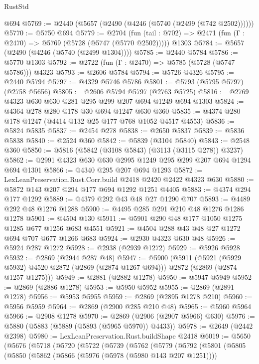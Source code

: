 \begin{lexlean}{RustStd}
\begin{coremodule}
{\begin{coremodule}
{{{{{{{{{{{{    @694
@5769 := @2440 (@5657 (@2490 (@4246 (@5740 (@2499 (@742 @2502))))))
@5770 := @5750 @694
@5779 := @2704
    (fun (tail : @702) => @2471 (fun (Γ : @2470) => @5769 (@5728 (@5747 (@5770 @2502)))))
    @1303
@5784 := @5657 (@2490 (@4246 (@5740 (@2499 @1304))))
@5785 := @2440 @5784
@5786 := @5770 @1303
@5792 := @2722 (fun (Γ : @2470) => @5785 (@5728 (@5747 @5786))) @4323
@5793 := @2606 @5784
@5794 := @5726 @4326
@5795 := @2440 @5794
@5797 := @4329 @5746 @5786
@5801 := @5793 (@5795 @5797) (@2758 @5656)
@5805 := @2606 @5794 @5797 (@2763 @5725)
@5816 := @2769 @4323 @630 @630 @281 @295 @299 @207 @694 @1249 @694 @1303
@5824 := @4364 @278 @280 @178 @30 @694 @1247 @630 @360
@5835 := @4374 @280 @178 @1247 (@4414 @132 @25 @177 @768 @1052 @4517 @4553)
@5836 := @5824 @5835
@5837 := @2454 @278
@5838 := @2650 @5837
@5839 := @5836 @5838
@5840 := @2524 @360
@5842 := @5839 (@3104 @5840)
@5843 := @2548 @360
@5850 := @5816 (@5842 (@3108 @5843) (@3113 (@3115 @278)) @3237)
@5862 := @2991 @4323 @630 @630 @2995 @1249 @295 @299 @207 @694 @1294 @694 @1301
@5866 := @4340 @295 @207 @694 @1293
@5872 := LexLeanPreservation.Rust.Corr.build @2418 @2420 @2422 @4323 @630
@5880 := @5872 @143 @207 @294 @177 @694 @1292 @1251 @4405
@5883 := @4374 @294 @177 @1292
@5889 := @4379 @292 @43 @48 @27 @1290 @707
@5893 := @4489 @292 @48 @1276 @1288
@5900 := @4495 @285 @291 @210 @48 @1276 @1286 @1278
@5901 := @4504 @130
@5911 := @5901 @290 @48 @177 @1050 @1275 @1285 @677 @1256 @683 @4551
@5921 := @4504 @288 @43 @48 @27 @1272 @694 @707 @677 @1266 @683
@5924 := @2930 @4323 @630 @48
@5926 := @5924 @287 @1272
@5928 := @2938 (@2939 @1272)
@5929 := @5926 @5928
@5932 := @2869 (@2944 @287 @48)
@5947 := @5900
    (@5911
      (@5921 (@5929 @5932) @4520 @2872 (@2869 (@2874 @1267 @694)))
      @2872
      (@2869 (@2874 @1257 @1275)))
@5949 := @2881 (@2882 @1278)
@5950 := @5947 @5949
@5952 := @2869 (@2886 @1278)
@5953 := @5950 @5952
@5955 := @2869 (@2891 @1278)
@5956 := @5953 @5955
@5959 := @2869 (@2895 @1278 @210)
@5960 := @5956 @5959
@5964 := @2869 (@2900 @285 @210 @48)
@5965 := @5960 @5964
@5966 := @2908 @1278
@5970 := @2869 (@2906 (@2907 @5966) @630)
@5976 := @5880 (@5883 (@5889 (@5893 (@5965 @5970)) @4433))
@5978 := @2649 (@2442 @2398)
@5980 := LexLeanPreservation.Rust.buildShape @2418
@6019 := @5650
    (@5676
      (@5718
        (@5720
          (@5722
            (@5739
              (@5762
                (@5779
                  (@5792
                    (@5801
                      (@5805
                        (@5850
                          (@5862
                            (@5866 (@5976 (@5978 (@5980 @143 @207 @1251))))
}}}}}}}}}}}}
\end{coremodule}}
\end{coremodule}
\end{lexlean}
